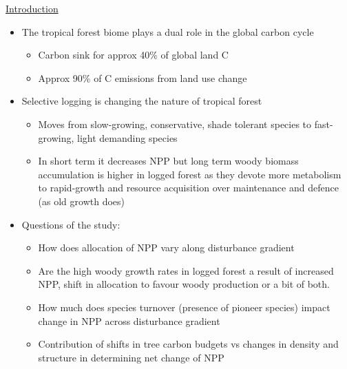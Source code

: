 \underline{Introduction}
\begin{itemize}
	\item The tropical forest biome plays a dual role in the global carbon cycle
	\begin{itemize}
		\item Carbon sink for approx 40\% of global land C
		\item Approx 90\% of C emissions from land use change
	\end{itemize}
	\item Selective logging is changing the nature of tropical forest
	\begin{itemize}
		\item Moves from slow-growing, conservative, shade tolerant species to fast-growing, light demanding species
		\item In short term it decreases NPP but long term woody biomass accumulation is higher in logged forest as they devote more metabolism to rapid-growth and resource acquisition over maintenance and defence (as old growth does) 
	\end{itemize}
	\item Questions of the study:
	\begin{itemize}
		\item How does allocation of NPP vary along disturbance gradient
		\item Are the high woody growth rates in logged forest a result of increased NPP, shift in allocation to favour woody production or a bit of both.
		\item How much does species turnover (presence of pioneer species) impact change in NPP across disturbance gradient
		\item Contribution of shifts in tree carbon budgets vs changes in density and structure in determining net change of NPP
	\end{itemize} 
\end{itemize}


